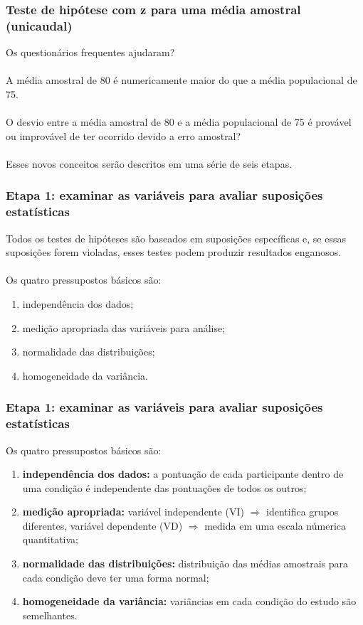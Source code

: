 \documentclass[11pt]{beamer}
\begin{document}
\begin{frame}
\frametitle{Teste de hipótese com z para uma média amostral (unicaudal)}

Os questionários frequentes ajudaram?\\~\\

A média amostral de 80 é numericamente maior do que a média populacional de 75.\\~\\

O desvio entre a média amostral de 80 e a média populacional de 75 é provável ou improvável de ter ocorrido devido a erro amostral?\\~\\

Esses novos conceitos serão descritos em uma série de seis etapas.

\end{frame}

\begin{frame}
\frametitle{Etapa 1: examinar as variáveis para avaliar suposições estatísticas}

Todos os testes de hipóteses são baseados em suposições específicas e, se essas suposições forem violadas, esses testes podem produzir resultados enganosos.\\~\\
Os quatro pressupostos básicos são:

\begin{enumerate}
\item independência dos dados;
\item medição apropriada das variáveis para análise;
\item normalidade das distribuições;
\item homogeneidade da variância.
\end{enumerate}

\end{frame}

\begin{frame}
\frametitle{Etapa 1: examinar as variáveis para avaliar suposições estatísticas}

Os quatro pressupostos básicos são:

\begin{enumerate}
\item \textbf{independência dos dados:} a pontuação de cada participante dentro de uma condição é independente das pontuações de todos os outros;
\item \textbf{medição apropriada:} variável independente (VI) \(\Rightarrow\) identifica grupos diferentes, variável dependente (VD) \(\Rightarrow\) medida em uma escala númerica quantitativa;
\item \textbf{normalidade das distribuições:} distribuição das médias amostrais para cada condição deve ter uma forma normal;
\item \textbf{homogeneidade da variância:} variâncias em cada condição do estudo são semelhantes.
\end{enumerate}

\end{frame}
\end{document}
